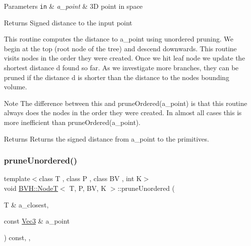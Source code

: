 \begin{DoxyParams}[1]{Parameters}
\mbox{\tt in}  & {\em a\+\_\+point} & 3D point in space \\
\hline
\end{DoxyParams}
\begin{DoxyReturn}{Returns}
Signed distance to the input point
\end{DoxyReturn}
This routine computes the distance to a\+\_\+point using unordered pruning. We begin at the top (root node of the tree) and descend downwards. This routine visits nodes in the order they were created. Once we hit leaf node we update the shortest distance \textquotesingle{}d\textquotesingle{} found so far. As we investigate more branches, they can be pruned if the distance \textquotesingle{}d\textquotesingle{} is shorter than the distance to the node\textquotesingle{}s bounding volume. \begin{DoxyNote}{Note}
The difference between this and prune\+Ordered(a\+\_\+point) is that this routine always does the nodes in the order they were created. In almost all cases this is more inefficient than prune\+Ordered(a\+\_\+point). 
\end{DoxyNote}
\begin{DoxyReturn}{Returns}
Returns the signed distance from a\+\_\+point to the primitives. 
\end{DoxyReturn}
\mbox{\label{classBVH_1_1NodeT_ad252aa451ca983750dfa0c24344253b2}} 
\subsubsection{\texorpdfstring{prune\+Unordered()}{pruneUnordered()}\hspace{0.1cm}{\footnotesize\ttfamily [2/2]}}
{\footnotesize\ttfamily template$<$class T , class P , class BV , int K$>$ \\
void \hyperlink{classBVH_1_1NodeT}{B\+V\+H\+::\+NodeT}$<$ T, P, BV, K $>$\+::prune\+Unordered (\begin{DoxyParamCaption}\item[{T \&}]{a\+\_\+closest,  }\item[{const \hyperlink{classBVH_1_1NodeT_a6fbb4308c5c55ee170c5f992df7ae1d0}{Vec3} \&}]{a\+\_\+point }\end{DoxyParamCaption}) const\hspace{0.3cm}{\ttfamily [inline]}, {\ttfamily [protected]}, {\ttfamily [noexcept]}}



